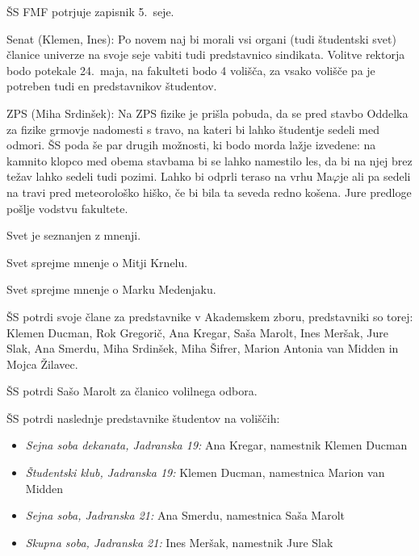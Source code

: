 \documentclass{seja}
\begin{document}
\begin{ad}
\item
\begin{sklep*}
  ŠS FMF potrjuje zapisnik 5.~seje.
\end{sklep*}

\item Senat (Klemen, Ines): Po novem naj bi morali vsi organi (tudi študentski svet) članice univerze na svoje seje vabiti tudi predstavnico sindikata. Volitve rektorja bodo potekale 24.~maja, na fakulteti bodo 4 volišča, za vsako volišče pa je potreben tudi en predstavnikov študentov.

ZPS (Miha Srdinšek): Na ZPS fizike je prišla pobuda, da se pred stavbo Oddelka za fizike grmovje nadomesti s travo, na kateri bi lahko študentje sedeli med odmori. ŠS poda še par drugih možnosti, ki bodo morda lažje izvedene: na kamnito klopco med obema stavbama bi se lahko namestilo les, da bi na njej brez težav lahko sedeli tudi pozimi. Lahko bi odprli teraso na vrhu Ma$\varphi$je ali pa sedeli na travi pred meteorološko hiško, če bi bila ta seveda redno košena. Jure predloge pošlje vodstvu fakultete.

\item
Svet je seznanjen z mnenji.

\begin{sklep*}
Svet sprejme mnenje o Mitji Krnelu.
\end{sklep*}
\begin{sklep*}
Svet sprejme mnenje o Marku Medenjaku.
\end{sklep*}

\item
\begin{sklep*}
ŠS potrdi svoje člane za predstavnike v Akademskem zboru, predstavniki so torej:
Klemen Ducman, Rok Gregorič, Ana Kregar, Saša Marolt, Ines Meršak, Jure Slak, Ana Smerdu, Miha Srdinšek, Miha Šifrer, Marion Antonia van Midden in Mojca Žilavec.
\end{sklep*}

\begin{sklep*}
ŠS potrdi Sašo Marolt za članico volilnega odbora.

ŠS potrdi naslednje predstavnike študentov na voliščih:
\begin{itemize}
    \item \textit{Sejna soba dekanata, Jadranska 19:} Ana Kregar, namestnik Klemen Ducman
    \item \textit{Študentski klub, Jadranska 19:} Klemen Ducman, namestnica Marion van Midden
    \item \textit{Sejna soba, Jadranska 21:} Ana Smerdu, namestnica Saša Marolt
    \item \textit{Skupna soba, Jadranska 21:} Ines Meršak, namestnik Jure Slak
\end{itemize}
\end{sklep*}


\end{ad}
\end{document}
